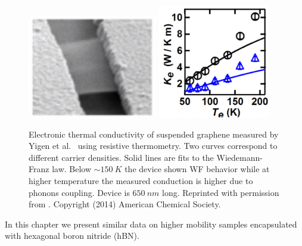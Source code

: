\begin{figure}
\centering
\includegraphics[height=45mm, valign=t]{figures/high_density_graphene/Yigen_picture.png}
\includegraphics[height=50mm, valign=t]{figures/high_density_graphene/Yigen_Gth.png}
\caption{Electronic thermal conductivity of suspended graphene measured by Yigen et al.~\cite{yigen_wiedemannfranz_2014} using resistive thermometry. Two curves correspond to different carrier densities. Solid lines are fits to the Wiedemann-Franz law. Below ${\sim150}~K$ the device shown WF behavior while at higher temperature the measured conduction is higher due to phonons coupling. Device is $650~nm$ long. Reprinted with permission from \cite{yigen_wiedemannfranz_2014}. Copyright (2014) American Chemical Society.}
\label{fig:Yigen}
\end{figure}

In this chapter we present similar data on higher mobility samples encapsulated with hexagonal boron nitride (hBN).


